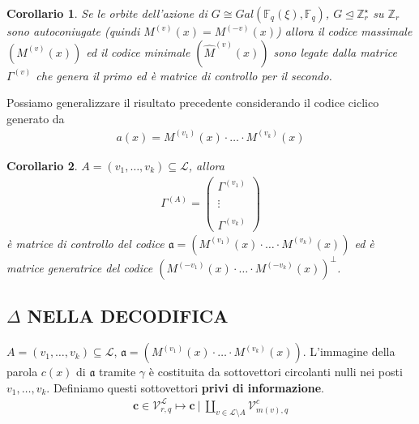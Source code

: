 \documentclass[mathserif]{beamer}
\newtheorem{corollario}{Corollario}
\begin{document}
\begin{frame}
    \begin{corollario}
      Se le orbite dell'azione di $G \cong Gal(\mathbb{F}_{q}(\xi),\mathbb{F}_{q})$, $G \trianglelefteq \mathbb{Z}_{r}^{\star} $ su $\mathbb{Z}_{r}$ sono autoconiugate (quindi $M^{(v)}(x) = M^{(-v)}(x)$) allora il codice massimale $(M^{(v)}(x))$ ed il codice minimale $(\hat{M}^{(v)}(x))$ sono legate dalla matrice $\Gamma^{(v)}$ che genera il primo ed è matrice di controllo per il secondo.
    \end{corollario}
    \vspace{1cm}
    Possiamo generalizzare il risultato precedente considerando il codice ciclico generato da
    \begin{align*}
      a(x) = M^{(v_{1})}(x)\cdot \dots \cdot M^{(v_{k})}(x)
    \end{align*}
\end{frame}
\begin{frame}
    \begin{corollario}
      $A=(v_{1}, \dots, v_{k}) \subseteq \mathscr{L}$, allora
      \begin{align*}
	  \Gamma^{(A)}
	  =
	  \left(
	  \begin{array} { c }
	  \Gamma^{(v_{1})}  \\ \\
	  \vdots \\ \\
	  \Gamma^{(v_{k})}
	  \end{array}
	  \right)
      \end{align*}
      è matrice di controllo del codice $\mathfrak{a} = (  M^{(v_{1})}(x)\cdot \dots \cdot M^{(v_{k})}(x) )$
      ed è matrice generatrice del codice $(  M^{(-v_{1})}(x)\cdot \dots \cdot M^{(-v_{k})}(x) )^{\perp}$.
    \end{corollario}
\end{frame}




\subsection{$\Delta$ NELLA DECODIFICA}
\begin{frame}
   $A=(v_{1}, \dots, v_{k}) \subseteq \mathscr{L}$, $\mathfrak{a} = (  M^{(v_{1})}(x)\cdot \dots \cdot M^{(v_{k})}(x) )$.
   L'immagine della parola $c(x)$ di $\mathfrak{a}$ tramite $\gamma$ è costituita da sottovettori circolanti nulli nei posti $v_{1}, \dots, v_{k}$. Definiamo questi sottovettori {\bf privi di informazione}.
    \begin{align*}
      \mathbf{c} \in \mathcal{V}_{r, q}^{\mathscr{L}}
      \mapsto
      \mathbf{c} ~ \Bigg|~ \coprod_{v\in \mathscr{L} \setminus A} \mathcal{V}_{m(v), q}^{c}
    \end{align*}
\end{frame}
\end{document}
